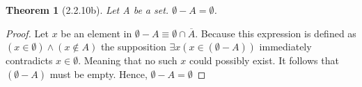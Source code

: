 \documentclass[a4paper, 12pt]{article}
\theoremstyle{plain}
\newtheorem*{theorem*}{Theorem}
\begin{document}
	
	\begin{theorem*}[2.2.10b]
		Let A be a set. $\emptyset - A = \emptyset$.
	\end{theorem*}
	
	\begin{proof}
		Let $x$ be an element in $\emptyset - A \equiv \emptyset \cap \overline{A}$. Because this expression 
		is defined as $(x \in \emptyset) \land (x \notin A)$ the supposition 
		$\exists x (x \in (\emptyset - A))$ immediately contradicts $x \in \emptyset$. Meaning that no such 
		$x$ could possibly exist. It follows that $(\emptyset - A)$ must be empty. Hence, 
		$\emptyset - A = \emptyset$
	\end{proof}
\end{document}
